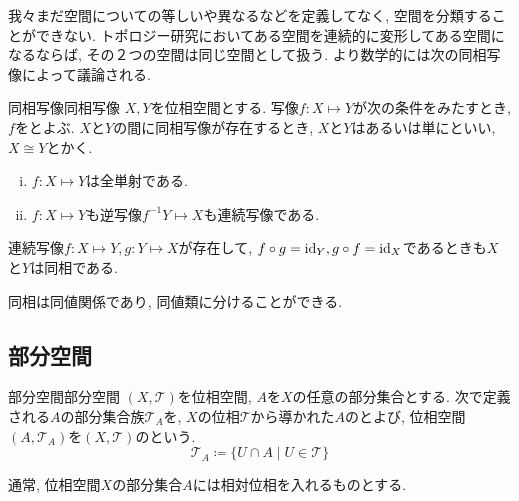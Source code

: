 \documentclass[../main.tex]{subfiles}
\begin{document}
        我々まだ空間についての等しいや異なるなどを定義してなく, 空間を分類することができない.
        トポロジー研究においてある空間を連続的に変形してある空間になるならば, その２つの空間は同じ空間として扱う.
        より数学的には次の同相写像によって議論される.
        \begin{dfn}{同相写像}{同相写像}
            $X,Y$を位相空間とする. 写像$f:X \mapsto Y$が次の条件をみたすとき, $f$をとよぶ. $X$と$Y$の間に同相写像が存在するとき, $X$と$Y$はあるいは単にといい, $X \cong Y$とかく.
            \begin{enumerate}[(i)]
                \item $f:X \mapsto Y$は全単射である.
                \item $f:X \mapsto Y$も逆写像$f^{-1}Y \mapsto X$も連続写像である.
            \end{enumerate}
        \end{dfn}
        連続写像$f:X \mapsto Y, g:Y \mapsto X$が存在して, $f \circ g = \operatorname{id}_Y, g \circ f = \operatorname{id}_X$であるときも$X$と$Y$は同相である.

        同相は同値関係であり, 同値類に分けることができる.

    \subsection{部分空間}
        \begin{dfn}{部分空間}{部分空間}
            $(X,\mathcal{T})$を位相空間, $A$を$X$の任意の部分集合とする.
            次で定義される$A$の部分集合族$\mathcal{T}_A$を, $X$の位相$\mathcal{T}$から導かれた$A$のとよび,
            位相空間$(A,\mathcal{T}_A)$を$(X,\mathcal{T})$のという.
            \begin{equation}
                \mathcal{T}_A \coloneqq \{U \cap A \mid U \in \mathcal{T}\}
            \end{equation}
        \end{dfn}
        通常, 位相空間$X$の部分集合$A$には相対位相を入れるものとする.
\end{document}
